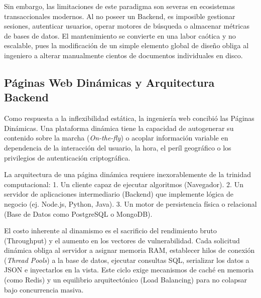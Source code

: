 \documentclass[11pt,a4paper,oneside]{report}
\begin{document}
Sin embargo, las limitaciones de este paradigma son severas en ecosistemas transaccionales modernos. Al no poseer un Backend, es imposible gestionar sesiones, autenticar usuarios, operar motores de b\'usqueda o almacenar m\'etricas de bases de datos. El mantenimiento se convierte en una labor ca\'otica y no escalable, pues la modificaci\'on de un simple elemento global de dise\~no obliga al ingeniero a alterar manualmente cientos de documentos individuales en disco.

\subsection{P\'aginas Web Din\'amicas y Arquitectura Backend}

Como respuesta a la inflexibilidad est\'atica, la ingenier\'ia web concibi\'o las P\'aginas Din\'amicas. Una plataforma din\'amica tiene la capacidad de autogenerar su contenido sobre la marcha (\textit{On-the-fly}) o acoplar informaci\'on variable en dependencia de la interacci\'on del usuario, la hora, el per\'il geogr\'afico o los privilegios de autenticaci\'on criptogr\'afica.

La arquitectura de una p\'agina din\'amica requiere inexorablemente de la trinidad computacional: 
1. Un cliente capaz de ejecutar algoritmos (Navegador).
2. Un servidor de aplicaciones intermediario (Backend) que implemente l\'ogica de negocio (ej. Node.js, Python, Java).
3. Un motor de persistencia f\'isica o relacional (Base de Datos como PostgreSQL o MongoDB).

El costo inherente al dinamismo es el sacrificio del rendimiento bruto (Throughput) y el aumento en los vectores de vulnerabilidad. Cada solicitud din\'amica obliga al servidor a asignar memoria RAM, establecer hilos de conexi\'on (\textit{Thread Pools}) a la base de datos, ejecutar consultas SQL, serializar los datos a JSON e inyectarlos en la vista. Este ciclo exige mecanismos de cach\'e en memoria (como Redis) y un equilibrio arquitect\'onico (Load Balancing) para no colapsar bajo concurrencia masiva.
\end{document}
